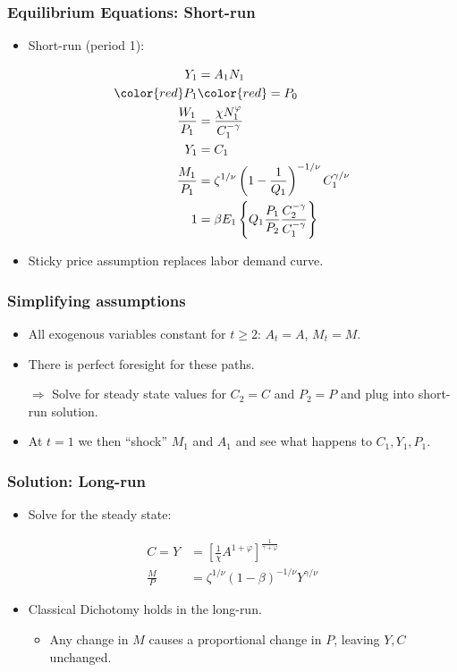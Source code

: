 \documentclass[english,xcolor=svgnames]{beamer}
\begin{document}
\begin{frame}
\frametitle{Equilibrium Equations: Short-run}
\begin{itemize}
	\item Short-run (period 1):
\end{itemize}
\begin{align*}
	Y_1&=A_1N_{1}  \\
	\color{red}P_1&\color{red}= P_0  \\
	\frac{W_1}{P_1}&=\frac{\chi N_1^\varphi}{C_1^{-\gamma}} \\
	Y_1&=C_1 \\
	\frac{M_1}{P_1}&=\zeta^{1/\nu}\left(1-\frac{1}{Q_1}\right)^{-1/\nu}C_{1}^{\gamma/\nu}\\
	1&=\beta E_1\left\{Q_1 \frac{P_1}{P_{2}} \frac{C_{2}^{-\gamma}}{C_{1}^{-\gamma}}\right\} 
\end{align*}
\begin{itemize}
	\item Sticky price assumption replaces labor demand curve.
\end{itemize}
\end{frame}




\begin{frame}
\frametitle{Simplifying assumptions
}
\begin{itemize}
	\item All exogenous variables constant for $t\ge 2$:  $A_t=A$, $M_t=M$. 
	\item There is perfect foresight for these paths.
	\item[$\Rightarrow$] Solve for steady state values for $C_2=C$ and $P_2=P$ and plug into short-run solution.
	\item At $t=1$ we then ``shock'' $M_1$ and $A_1$ and see what happens to $C_1,Y_1,P_1$.
\end{itemize}	
\end{frame}


\begin{frame}
\frametitle{Solution: Long-run}
\begin{itemize}
	\item Solve for the steady state:
\end{itemize}
\begin{align*}
	C = Y &=\left[\frac{1}{\chi} A^{1 + \varphi}\right]^{\frac{1}{\gamma + \varphi}} \\
	\frac{M}{P}&=\zeta^{1/\nu}\left(1-\beta\right)^{-1/\nu}Y^{\gamma/\nu}
\end{align*}
\begin{itemize}
	\item Classical Dichotomy holds in the long-run.
	\begin{itemize}
		\item Any change in $M$ causes a proportional change in $P$, leaving $Y,C$ unchanged.
	\end{itemize}
\end{itemize}
\end{frame}
\end{document}
